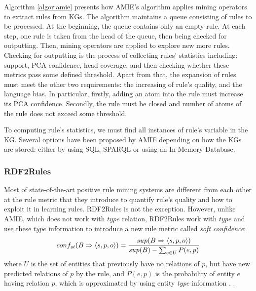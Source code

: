 Algorithm \ref{algor:amie} presents how AMIE's algorithm applies mining operators to extract rules from KGs. The algorithm maintains a queue consisting of rules to be processed. At the beginning, the queue contains only an empty rule. At each step, one rule is taken from the head of the queue, then being checked for outputting. Then, mining operators are applied to explore new more rules.
Checking for outputting is the process of collecting rules' statistics including: support, PCA confidence, head coverage, and then checking whether these metrics pass some defined threshold. Apart from that, the expansion of rules must meet the other two requirements: the increasing of rule's quality, and the language bias. In particular, firstly, adding an atom into the rule must increase its PCA confidence. Secondly, the rule must be closed and number of atoms of the rule does not exceed some threshold.

To computing rule's statistics, we must find all instances of rule's variable in the KG. Several options have been proposed by AMIE depending on how the KGs are stored: either by using SQL, SPARQL \cite{amie} or using an In-Memory Database.

\subsubsection{RDF2Rules}
Most of state-of-the-art positive rule mining systems are different from each other at the rule metric that they introduce to quantify rule's quality and how to exploit it in learning rules. RDF2Rules is not the exception. However, unlike AMIE, which does not work with $type$ relation, RDF2Rules \cite{rdf2rules} work with $type$ and use these $type$ information to  introduce a new rule metric called \textit{soft confidence}:
\[conf_{st}(B \Rightarrow \langle s,p,o\rangle) = \frac{sup(B \Rightarrow \langle s,p,o\rangle)}{sup(B) - \sum_{e \in U}P(e,p)} \]
where $U$ is the set of entities that previously have no relations of $p$, but have new predicted relations of $p$ by the rule, and $P(e,p)$ is the probability of entity $e$ having relation $p$, which is approximated by using entity \textit{type} information \cite{rdf2rules}. .

